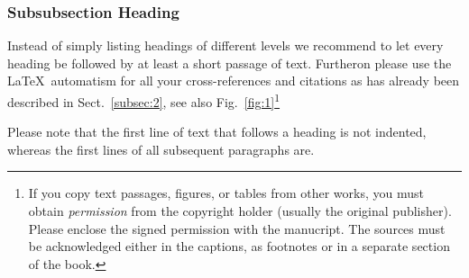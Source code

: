 \subsubsection{Subsubsection Heading}
Instead of simply listing headings of different levels we recommend to let every heading be followed by at least a short passage of text. Furtheron please use the \LaTeX\ automatism for all your cross-references and citations as has already been described in Sect.~\ref{subsec:2}, see also Fig.~\ref{fig:1}\footnote{If you copy text passages, figures, or tables from other works, you must obtain \textit{permission} from the copyright holder (usually the original publisher). Please enclose the signed permission with the manucript. The sources must be acknowledged either in the captions, as footnotes or in a separate section of the book.}

Please note that the first line of text that follows a heading is not indented, whereas the first lines of all subsequent paragraphs are.

%

	

